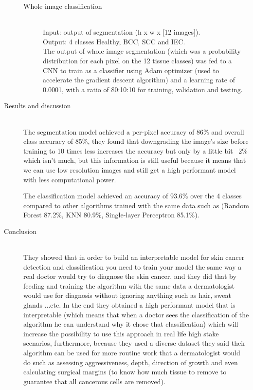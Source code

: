\begin{description}
\begin{description}
    \item[Whole image classification] \hfill \\

        Input: output of segmentation (h x w x [12 images]). \hfill \\
        Output: 4 classes Healthy, BCC, SCC and IEC. \hfill \\
        The output of whole image segmentation (which was a probability distribution for each pixel on the 12 tissue classes) was fed to a CNN to train as a classifier using Adam optimizer (used to accelerate the gradient descent algorithm) and a learning rate of 0.0001, with a ratio of 80:10:10 for training, validation and testing.
    \end{description}


\item[Results and discussion] \hfill \\
    The segmentation model achieved a per-pixel accuracy of 86\% and overall class accuracy of 85\%, they found that downgrading the image's size before training to 10 times less increases the accuracy but only by a little bit ~2\% which isn't much, but this information is still useful because it means that we can use low resolution images and still get a high performant model with less computational power.

    The classification model achieved an accuracy of 93.6\% over the 4 classes compared to other algorithms trained with the same data such as (Random Forest 87.2\%, KNN 80.9\%, Single-layer Perceptron 85.1\%).


\item[Conclusion] \hfill \\
    They showed that in order to build an interpretable model for skin cancer detection and classification you need to train your model the same way a real doctor would try to diagnose the skin cancer, and they did that by feeding and training the algorithm with the same data a dermatologist would use for diagnosis without ignoring anything such as hair, sweat glands ...etc. In the end they obtained a high performant model that is interpretable (which means that when a doctor sees the classification of the algorithm he can understand why it chose that classification) which will increase the possibility to use this approach in real life high stake scenarios, furthermore, because they used a diverse dataset they said their algorithm can be used for more routine work that a dermatologist would do such as assessing aggressiveness, depth, direction of growth and even calculating surgical margins (to know how much tissue to remove to guarantee that all cancerous cells are removed).
\end{description}



